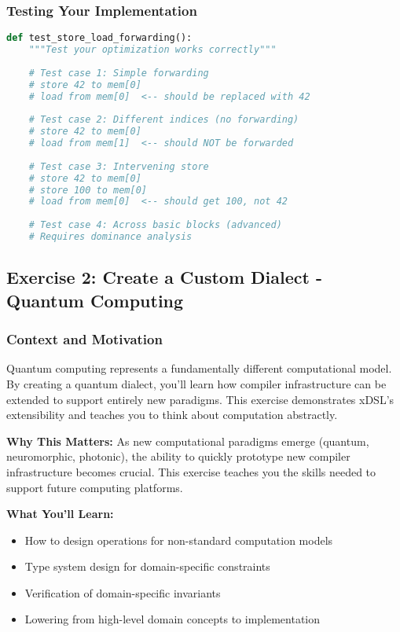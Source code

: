 \documentclass[11pt,a4paper]{article}
\begin{document}
\subsubsection{Testing Your Implementation}

\begin{lstlisting}[language=Python, caption=Test Cases for Store-Load Forwarding]
def test_store_load_forwarding():
    """Test your optimization works correctly"""
    
    # Test case 1: Simple forwarding
    # store 42 to mem[0]
    # load from mem[0]  <-- should be replaced with 42
    
    # Test case 2: Different indices (no forwarding)
    # store 42 to mem[0]
    # load from mem[1]  <-- should NOT be forwarded
    
    # Test case 3: Intervening store
    # store 42 to mem[0]
    # store 100 to mem[0]
    # load from mem[0]  <-- should get 100, not 42
    
    # Test case 4: Across basic blocks (advanced)
    # Requires dominance analysis
\end{lstlisting}

\subsection{Exercise 2: Create a Custom Dialect - Quantum Computing}

\subsubsection{Context and Motivation}

Quantum computing represents a fundamentally different computational model. By creating a quantum dialect, you'll learn how compiler infrastructure can be extended to support entirely new paradigms. This exercise demonstrates xDSL's extensibility and teaches you to think about computation abstractly.

\textbf{Why This Matters:} As new computational paradigms emerge (quantum, neuromorphic, photonic), the ability to quickly prototype new compiler infrastructure becomes crucial. This exercise teaches you the skills needed to support future computing platforms.

\textbf{What You'll Learn:}
\begin{itemize}
    \item How to design operations for non-standard computation models
    \item Type system design for domain-specific constraints
    \item Verification of domain-specific invariants
    \item Lowering from high-level domain concepts to implementation
\end{itemize}
\end{document}
